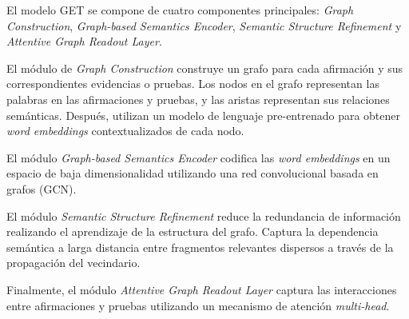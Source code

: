 El modelo GET se compone de cuatro componentes principales: \textit{Graph Construction}, \textit{Graph-based Semantics Encoder}, \textit{Semantic Structure Refinement} y \textit{Attentive Graph Readout Layer}.

El módulo de \textit{Graph Construction} construye un grafo para cada afirmación y sus correspondientes evidencias o pruebas. Los nodos en el grafo representan las palabras en las afirmaciones y pruebas, y las aristas representan sus relaciones semánticas. Después, utilizan un modelo de lenguaje pre-entrenado para obtener \textit{word embeddings} contextualizados de cada nodo.

El módulo \textit{Graph-based Semantics Encoder} codifica las \textit{word embeddings} en un espacio de baja dimensionalidad utilizando una red convolucional basada en grafos (GCN).

El módulo \textit{Semantic Structure Refinement} reduce la redundancia de información realizando el aprendizaje de la estructura del grafo. Captura la dependencia semántica a larga distancia entre fragmentos relevantes dispersos a través de la propagación del vecindario.

Finalmente, el módulo \textit{Attentive Graph Readout Layer} captura las interacciones entre afirmaciones y pruebas utilizando un mecanismo de atención \textit{multi-head}.
